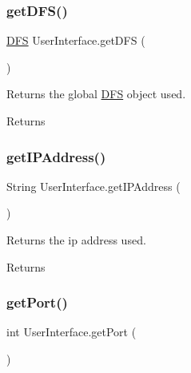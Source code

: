 \subsubsection{\texorpdfstring{get\+D\+F\+S()}{getDFS()}}
{\footnotesize\ttfamily \mbox{\hyperlink{class_d_f_s}{D\+FS}} User\+Interface.\+get\+D\+FS (\begin{DoxyParamCaption}{ }\end{DoxyParamCaption})\hspace{0.3cm}{\ttfamily [inline]}}

Returns the global \mbox{\hyperlink{class_d_f_s}{D\+FS}} object used. \begin{DoxyReturn}{Returns}

\end{DoxyReturn}
\mbox{\label{class_user_interface_a2fda154134eb10db7b184de5a6df5b23}} 
\subsubsection{\texorpdfstring{get\+I\+P\+Address()}{getIPAddress()}}
{\footnotesize\ttfamily String User\+Interface.\+get\+I\+P\+Address (\begin{DoxyParamCaption}{ }\end{DoxyParamCaption})\hspace{0.3cm}{\ttfamily [inline]}}

Returns the ip address used. \begin{DoxyReturn}{Returns}

\end{DoxyReturn}
\mbox{\label{class_user_interface_af046587dab904a279c4bde6df3fba567}} 
\subsubsection{\texorpdfstring{get\+Port()}{getPort()}}
{\footnotesize\ttfamily int User\+Interface.\+get\+Port (\begin{DoxyParamCaption}{ }\end{DoxyParamCaption})\hspace{0.3cm}{\ttfamily [inline]}}

